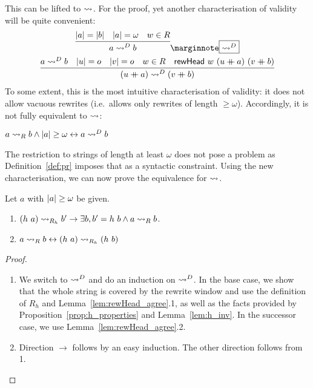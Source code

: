 This can be lifted to $\strent{}$. For the proof, yet another characterisation of validity will be quite convenient:
\begin{gather*}
  \infer{a \strentD{R} b}{\length{a} = \length{b} \quad \length{a} = \omega \quad w \in R}
  \mnote{$\strentD{R}$}\\
  \infer{(u \concat a) \strentD{R} (v \concat b)}{a \strentD{R} b \quad \length{u} = o \quad \length{v} = o \quad w \in R \quad \rewHead{w}{(u \concat a)}{(v \concat b)}}
\end{gather*}
To some extent, this is the most intuitive characterisation of validity: it does not allow vacuous rewrites (i.e.\ allows only rewrites of length $\ge \omega$). Accordingly, it is not fully equivalent to $\strent{}$:
\begin{lemma}
  $a \strent{R} b \land \length{a} \ge \omega \leftrightarrow a \strentD{R} b$
\end{lemma}

The restriction to strings of length at least $\omega$ does not pose a problem as Definition~\ref{def:pr} imposes that as a syntactic constraint.
Using the new characterisation, we can now prove the equivalence for $\strent{}$.
\begin{lemma}
  Let $a$ with $\length{a} \ge \omega$ be given.
  \begin{enumerate}
    \item $(h~a) \strent{R_h} b' \rightarrow \exists b, b' = h~b \land a \strent{R} b$. 
    \item $a \strent{R} b \leftrightarrow (h~a) \strent{R_h} (h~b)$
  \end{enumerate}
\end{lemma}
\begin{proof}
  \begin{enumerate}
    \item We switch to $\strentD{}$ and do an induction on $\strentD{}$. In the base case, we show that the whole string is covered by the rewrite window and use the definition of $R_h$ and Lemma~\ref{lem:rewHead_agree}.1, as well as the facts provided by Proposition~\ref{prop:h_properties} and Lemma~\ref{lem:h_inv}.
      In the successor case, we use Lemma~\ref{lem:rewHead_agree}.2.
    \item Direction $\rightarrow$ follows by an easy induction. The other direction follows from 1.
  \end{enumerate}
\end{proof}

